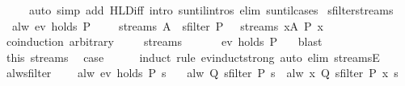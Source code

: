 \begin{isabellebody}
\ \ \ \ \ {\isacharparenleft}auto\ simp\ add{\isacharcolon}\ HLD{\isacharunderscore}iff\ intro{\isacharcolon}\ suntil{\isachardot}intros\ elim{\isacharcolon}\ suntil{\isachardot}cases{\isacharparenright}%
\endisatagproof
{\isafoldproof}%
%
\isadelimproof
\isanewline
%
\endisadelimproof
\isanewline
{}\isamarkupfalse%
\ sfilter{\isacharunderscore}streams{\isacharcolon}\isanewline
\ \ {\isachardoublequoteopen}alw\ {\isacharparenleft}ev\ {\isacharparenleft}holds\ P{\isacharparenright}{\isacharparenright}\ {\isasymomega}\ {\isasymLongrightarrow}\ {\isasymomega}\ {\isasymin}\ streams\ A\ {\isasymLongrightarrow}\ sfilter\ P\ {\isasymomega}\ {\isasymin}\ streams\ {\isacharbraceleft}x{\isasymin}A{\isachardot}\ P\ x{\isacharbraceright}{\isachardoublequoteclose}\isanewline
%
\isadelimproof
%
\endisadelimproof
%
\isatagproof
{}\isamarkupfalse%
\ {\isacharparenleft}coinduction\ arbitrary{\isacharcolon}\ {\isasymomega}{\isacharparenright}\isanewline
\ \ \isamarkupfalse%
\ {\isacharparenleft}streams\ {\isasymomega}{\isacharparenright}\isanewline
\ \ \isamarkupfalse%
\ \isamarkupfalse%
\ {\isachardoublequoteopen}ev\ {\isacharparenleft}holds\ P{\isacharparenright}\ {\isasymomega}{\isachardoublequoteclose}\ \isamarkupfalse%
\ blast\isanewline
\ \ \isamarkupfalse%
\ this\ streams\ \isamarkupfalse%
\ {\isacharquery}case\isanewline
\ \ \ \ \isamarkupfalse%
\ {\isacharparenleft}induct\ rule{\isacharcolon}\ ev{\isacharunderscore}induct{\isacharunderscore}strong{\isacharparenright}\ {\isacharparenleft}auto\ elim{\isacharcolon}\ streamsE{\isacharparenright}\isanewline
{}\isamarkupfalse%
%
\endisatagproof
{\isafoldproof}%
%
\isadelimproof
\isanewline
%
\endisadelimproof
\isanewline
{}\isamarkupfalse%
\ alw{\isacharunderscore}sfilter{\isacharcolon}\isanewline
\ \ \ {\isacharasterisk}{\isacharcolon}\ {\isachardoublequoteopen}alw\ {\isacharparenleft}ev\ {\isacharparenleft}holds\ P{\isacharparenright}{\isacharparenright}\ s{\isachardoublequoteclose}\isanewline
\ \ \ {\isachardoublequoteopen}alw\ Q\ {\isacharparenleft}sfilter\ P\ s{\isacharparenright}\ {\isasymlongleftrightarrow}\ alw\ {\isacharparenleft}{\isasymlambda}x{\isachardot}\ Q\ {\isacharparenleft}sfilter\ P\ x{\isacharparenright}{\isacharparenright}\ s{\isachardoublequoteclose}\isanewline
%
\isadelimproof
%
\endisadelimproof
%
\isatagproof
{}\isamarkupfalse%
\isanewline
\ \ \isamarkupfalse%

\end{isabellebody}
